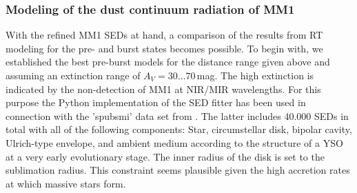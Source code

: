 \documentclass[longauth,usenatbib]{aa}
\begin{document}
\subsubsection{Modeling of the dust continuum radiation of MM1}\label{drt1}

With the refined MM1 SEDs at hand, a comparison of the results from RT modeling for the pre- and burst states becomes possible.
To begin with, we established the best pre-burst models 
for the distance range given above and assuming an extinction range of $A_V=30\dots70$\,mag. The high extinction is indicated by the non-detection of MM1 at NIR/MIR wavelengths. For this purpose the Python implementation of the SED fitter  has been used in connection with the 'spubsmi' data set from . The latter includes 
40.000 SEDs in total with all of the following components: Star, circumstellar disk, bipolar cavity, Ulrich-type envelope, and ambient medium according to the structure of a YSO at a very early evolutionary stage. The inner radius of the disk is set to the sublimation radius. This constraint seems plausible given the high accretion rates at which massive stars form.
\end{document}
